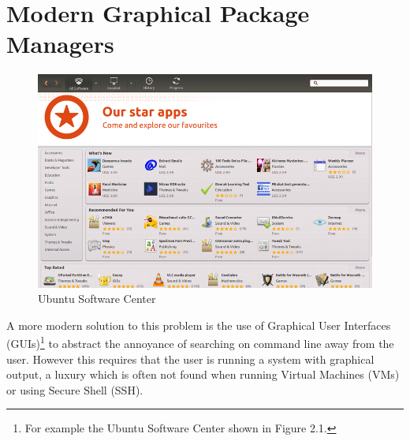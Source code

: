 \documentclass{l4proj}
\begin{document}
\section{Modern Graphical Package Managers}
\begin{figure}
\centerline{\includegraphics[scale=0.5]{images/ubuntu_software.png}}
\caption{Ubuntu Software Center}
\end{figure}
A more modern solution to this problem is the use of Graphical User Interfaces (GUIs)\footnote{For example the Ubuntu Software Center shown in Figure 2.1.} to abstract the annoyance of searching on command line away from the user. However this requires that the user is running a system with graphical output, a luxury which is often not found when running Virtual Machines (VMs) or using Secure Shell (SSH).
\end{document}

